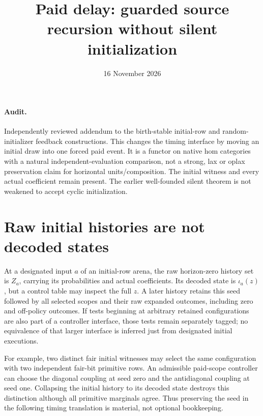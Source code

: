 \documentclass[11pt]{article}
\title{Paid delay: guarded source recursion without silent initialization}
\date{16 November 2026}
\begin{document}
\maketitle
\paragraph{Audit.} Independently reviewed addendum to the birth-stable initial-row and random-initializer feedback constructions. This changes the timing interface by moving an initial draw into one forced paid event. It is a functor on native hom categories with a natural independent-evaluation comparison, not a strong, lax or oplax preservation claim for horizontal units/composition. The initial witness and every actual coefficient remain present. The earlier well-founded silent theorem is not weakened to accept cyclic initialization.

\section{Raw initial histories are not decoded states}
At a designated input $a$ of an initial-row arena, the raw horizon-zero history set is $Z_a$, carrying its probabilities and actual coefficients. Its decoded state is $\iota_a(z)$, but a control table may inspect the full $z$. A later history retains this seed followed by all selected scopes and their raw expanded outcomes, including zero and off-policy outcomes. If tests beginning at arbitrary retained configurations are also part of a controller interface, those tests remain separately tagged; no equivalence of that larger interface is inferred just from designated initial executions.

For example, two distinct fair initial witnesses may select the same configuration with two independent fair-bit primitive rows. An admissible paid-scope controller can choose the diagonal coupling at seed zero and the antidiagonal coupling at seed one. Collapsing the initial history to its decoded state destroys this distinction although all primitive marginals agree. Thus preserving the seed in the following timing translation is material, not optional bookkeeping.
\end{document}
